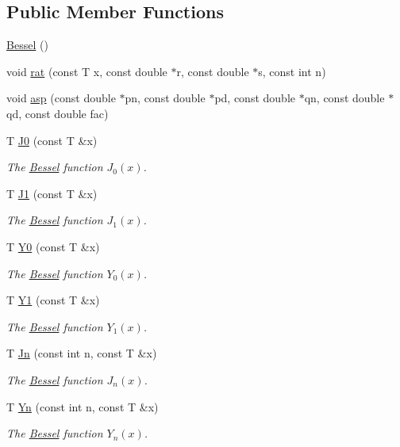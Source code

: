 \subsection*{Public Member Functions}
\begin{DoxyCompactItemize}
\item 
\hyperlink{structLuna_1_1Bessel_aefa78789b4db0a57f4a6f178ebba1d7f}{Bessel} ()
\item 
void \hyperlink{structLuna_1_1Bessel_aa42218eff6062d962d3fd1287c458583}{rat} (const T x, const double $\ast$r, const double $\ast$s, const int n)
\item 
void \hyperlink{structLuna_1_1Bessel_aaa00a95b752eec29e8c370e17f10f6c0}{asp} (const double $\ast$pn, const double $\ast$pd, const double $\ast$qn, const double $\ast$qd, const double fac)
\item 
T \hyperlink{structLuna_1_1Bessel_a8eeb87d47905d77825276a27ff59de12}{J0} (const T \&x)
\begin{DoxyCompactList}\small\item\em The \hyperlink{structLuna_1_1Bessel}{Bessel} function $ J_0(x) $. \end{DoxyCompactList}\item 
T \hyperlink{structLuna_1_1Bessel_aa9666abfed63d6b97db0b2b776135ef4}{J1} (const T \&x)
\begin{DoxyCompactList}\small\item\em The \hyperlink{structLuna_1_1Bessel}{Bessel} function $ J_1(x) $. \end{DoxyCompactList}\item 
T \hyperlink{structLuna_1_1Bessel_aaa4710f118acafa90f55c1a93b3748da}{Y0} (const T \&x)
\begin{DoxyCompactList}\small\item\em The \hyperlink{structLuna_1_1Bessel}{Bessel} function $ Y_0(x) $. \end{DoxyCompactList}\item 
T \hyperlink{structLuna_1_1Bessel_ab93c15c62695c56fd1d399a00e9a124a}{Y1} (const T \&x)
\begin{DoxyCompactList}\small\item\em The \hyperlink{structLuna_1_1Bessel}{Bessel} function $ Y_1(x) $. \end{DoxyCompactList}\item 
T \hyperlink{structLuna_1_1Bessel_a7df1de7f7173193becc3be8a0c0071a9}{Jn} (const int n, const T \&x)
\begin{DoxyCompactList}\small\item\em The \hyperlink{structLuna_1_1Bessel}{Bessel} function $ J_n(x) $. \end{DoxyCompactList}\item 
T \hyperlink{structLuna_1_1Bessel_aeffbc7ae897573b756c0ddab93ecf6de}{Yn} (const int n, const T \&x)
\begin{DoxyCompactList}\small\item\em The \hyperlink{structLuna_1_1Bessel}{Bessel} function $ Y_n(x) $. \end{DoxyCompactList}\end{DoxyCompactItemize}
